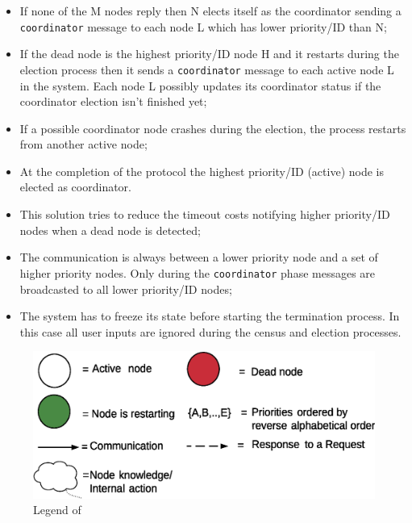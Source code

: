 \begin{itemize}
  \item If none of the M nodes reply then N elects itself as the coordinator sending a \texttt{coordinator} message to each node L which has lower priority/ID than N;
  \item If the dead node is the highest priority/ID node H and it restarts during the election process then it sends a \texttt{coordinator} message to each active node L in the system. Each node L possibly updates its coordinator status if the coordinator election isn't finished yet;
  \item If a possible coordinator node crashes during the election, the process restarts from another active node;
  \item At the completion of the protocol the highest priority/ID (active) node is elected as coordinator.
  \item This solution tries to reduce the timeout costs notifying higher priority/ID nodes when a dead node is detected;
  \item The communication is always between a lower priority node and a set of higher priority nodes. Only during the \texttt{coordinator} phase messages are broadcasted to all lower priority/ID nodes;
  \item The system has to freeze its state before starting the termination process. In this case all user inputs are ignored during the census and election processes.
\end{itemize}


\begin{figure}[H]
  \centering
  \includegraphics[width=.6\columnwidth]{images/solution/election_legend.eps}
  \caption{Legend of }
  \label{fig:election-protocol-legend}
\end{figure}

